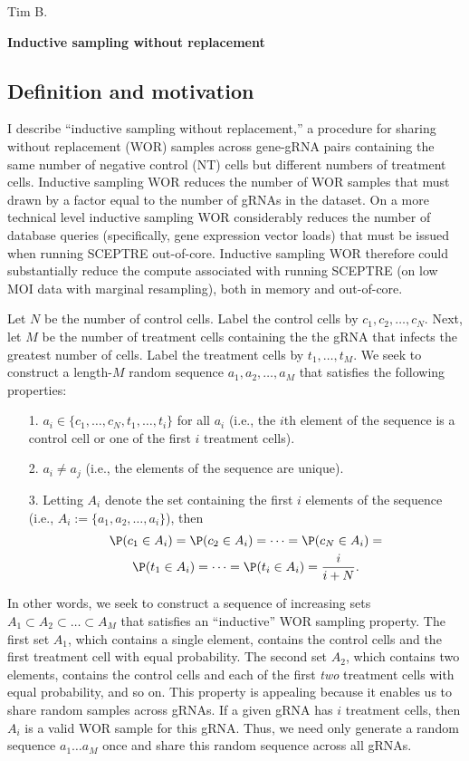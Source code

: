 \documentclass[12pt]{article}
\begin{document}
\noindent
Tim B.

\begin{center}
\textbf{Inductive sampling without replacement}
\end{center}

\subsection*{Definition and motivation}

I describe ``inductive sampling without replacement,'' a procedure for sharing without replacement (WOR) samples across gene-gRNA pairs containing the same number of negative control (NT) cells but different numbers of treatment cells. Inductive sampling WOR reduces the number of WOR samples that must drawn by a factor equal to the number of gRNAs in the dataset. On a more technical level inductive sampling WOR considerably reduces the number of database queries (specifically, gene expression vector loads) that must be issued when running SCEPTRE out-of-core. Inductive sampling WOR therefore could substantially reduce the compute associated with running SCEPTRE (on low MOI data with marginal resampling), both in memory and out-of-core.

Let $N$ be the number of control cells. Label the control cells by $c_1, c_2, \dots, c_N$. Next, let $M$ be the number of treatment cells containing the the gRNA that infects the greatest number of cells. Label the treatment cells by $t_1, \dots, t_M$. We seek to construct a length-$M$ random sequence $a_1, a_2, \dots, a_M$ that satisfies the following properties:
\begin{itemize}
\item[1.] $a_i \in \{ c_1, \dots, c_N, t_1, \dots, t_i \} $ for all $a_i$ (i.e., the $i$th element of the sequence is a control cell or one of the first $i$ treatment cells).
\item[2.] $a_i \neq a_j$ (i.e., the elements of the sequence are unique).
\item[3.] Letting $A_i$ denote the set containing the first $i$ elements of the sequence (i.e., $A_i := \{ a_1, a_2, \dots, a_i \}$), then
\begin{multline*}
\P(c_1 \in A_i) = \P(c_2 \in A_i) = \dots = \P(c_N \in A_i) = \\ \P(t_1 \in A_i) = \dots = \P(t_i \in A_i) = \frac{i}{i + N}.
\end{multline*}
\end{itemize}

In other words, we seek to construct a sequence of increasing sets $A_1 \subset A_2 \subset \dots \subset A_M$ that satisfies an ``inductive'' WOR sampling property. The first set $A_1$, which contains a single element, contains the control cells and the first treatment cell with equal probability. The second set $A_2$, which contains two elements, contains the control cells and each of the first \textit{two} treatment cells with equal probability, and so on. This property is appealing because it enables us to share random samples across gRNAs. If a given gRNA has $i$ treatment cells, then $A_i$ is a valid WOR sample for this gRNA. Thus, we need only generate a random sequence $a_1 \dots a_M$ once and share this random sequence across all gRNAs.
\end{document}
